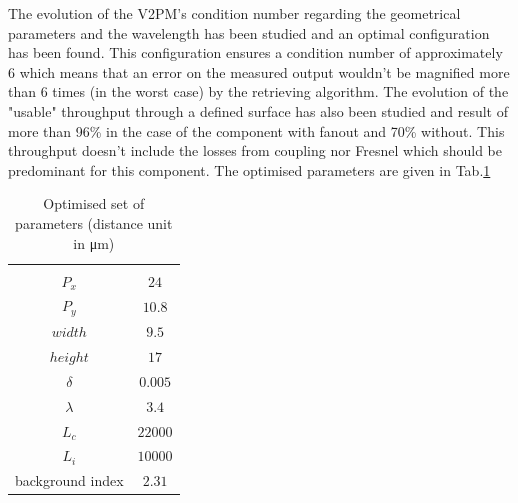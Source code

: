The evolution of the V2PM's condition number regarding the geometrical parameters and the wavelength has been studied and an optimal configuration has been found. This configuration ensures a condition number of approximately 6 which means that an error on the measured output wouldn't be magnified more than 6 times (in the worst case) by the retrieving algorithm. The evolution of the "usable" throughput through a defined surface has also been studied and result of more than 96\% in the case of the component with fanout and 70\% without. This throughput doesn't include the losses from coupling nor Fresnel which should be predominant for this component. The optimised parameters are given in Tab.\ref{tab:optimised_parameters}


\begin{table}[htbp]
\begin{center}
\begin{tabular}{|c|c|}
\multicolumn{1}{c}{} &\multicolumn{1}{c}{} \\ \cline{1-2}
  $P_x$ & $\num{24}$ \\ \cline{1-2}
  $P_y$ & $\num{10,8}$\\\cline{1-2}
  $width$ & $\num{9,5}$ \\\cline{1-2}
  $height$ & $\num{17}$  \\\cline{1-2}
  $\delta$ & $\num{0,005}$  \\\cline{1-2}
  $\lambda$ & $\num{3,4}$ \\\cline{1-2}
  $L_c$ & $\num{22000}$  \\\cline{1-2}
  $L_i$ & $\num{10000}$  \\\cline{1-2}
  background index & $\num{2,31}$  \\\cline{1-2}
\end{tabular}\\
\end{center}
\caption{Optimised set of parameters (distance unit in \si{\micro\meter})}
\label{tab:optimised_parameters}
\end{table}
